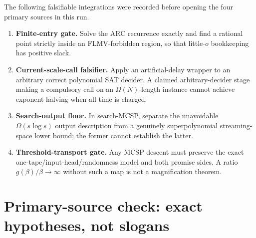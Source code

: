 \documentclass[11pt]{article}
\begin{document}
The following falsifiable integrations were recorded before opening the four
primary sources in this run.
\begin{enumerate}[leftmargin=*]
  \item \textbf{Finite-entry gate.}  Solve the ARC recurrence exactly and find
  a rational point strictly inside an FLMV-forbidden region, so that little-$o$
  bookkeeping has positive slack.
  \item \textbf{Current-scale-call falsifier.}  Apply an artificial-delay
  wrapper to an arbitrary correct polynomial SAT decider.  A claimed
  arbitrary-decider stage making a compulsory call on an $\Omega(N)$-length
  instance cannot achieve exponent halving when all time is charged.
  \item \textbf{Search-output floor.}  In search-MCSP, separate the unavoidable
  $\Omega(s\log s)$ output description from a genuinely superpolynomial
  streaming-space lower bound; the former cannot establish the latter.
  \item \textbf{Threshold-transport gate.}  Any MCSP descent must preserve the
  exact one-tape/input-head/randomness model and both promise sides.  A ratio
  $g(\beta)/\beta\to\infty$ without such a map is not a magnification theorem.
\end{enumerate}

\section{Primary-source check: exact hypotheses, not slogans}
\end{document}
